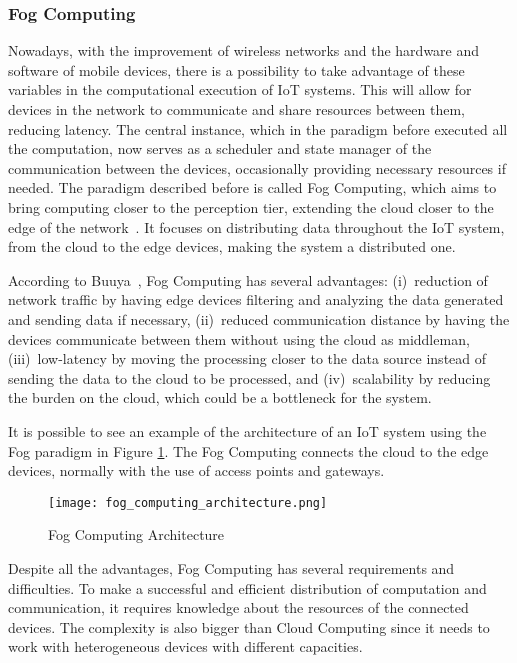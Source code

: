 \subsubsection{Fog Computing}\label{sec:fog_computing}

Nowadays, with the improvement of wireless networks and the hardware and software of mobile devices, there is a possibility to take advantage of these variables in the computational execution of IoT systems. This will allow for devices in the network to communicate and share resources between them, reducing latency. The central instance, which in the paradigm before executed all the computation, now serves as a scheduler and state manager of the communication between the devices, occasionally providing necessary resources if needed. The paradigm described before is called Fog Computing, which aims to bring computing closer to the perception tier, extending the cloud closer to the edge of the network~\cite{mobile_cloud}. It focuses on distributing data throughout the IoT system, from the cloud to the edge devices, making the system a distributed one.

According to Buuya~\cite{IoT_principles_and_paradigms}, Fog Computing has several advantages: (i)~reduction of network traffic by having edge devices filtering and analyzing the data generated and sending data if necessary, (ii)~reduced communication distance by having the devices communicate between them without using the cloud as middleman, (iii)~low-latency by moving the processing closer to the data source instead of sending the data to the cloud to be processed, and (iv)~scalability by reducing the burden on the cloud, which could be a bottleneck for the system.

It is possible to see an example of the architecture of an IoT system using the Fog paradigm in Figure \ref{fig:fog_architecture}. The Fog Computing connects the cloud to the edge devices, normally with the use of access points and gateways. 

\begin{figure}[h]
\label{fig:fog_architecture}
\centering
\texttt{[image: fog\_computing\_architecture.png]}
\caption[Fog Computing Architecture]{Fog Computing Architecture~\cite{IoT_principles_and_paradigms}}
\end{figure}

Despite all the advantages, Fog Computing has several requirements and difficulties. To make a successful and efficient distribution of computation and communication, it requires knowledge about the resources of the connected devices. The complexity is also bigger than Cloud Computing since it needs to work with heterogeneous devices with different capacities. 
       
